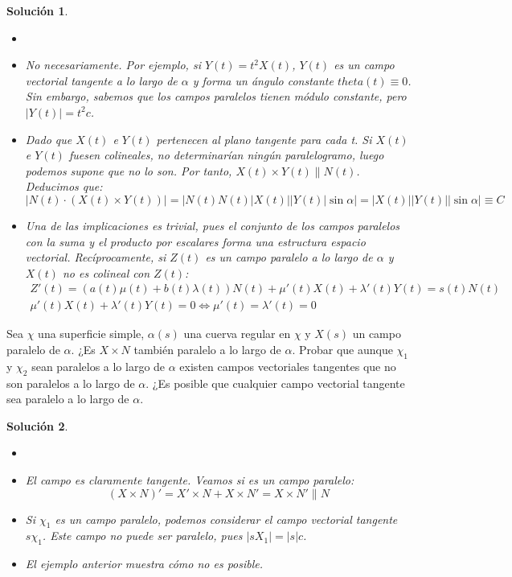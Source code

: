 \documentclass{article}
\theoremstyle{plain}
\newtheorem*{sol*}{Solución}
\newcommand{\X}{\chi}
\newenvironment{ejercicio}[2][Estado]{\begin{trivlist}
\item[\hskip \labelsep {\bfseries Ejercicio}\hskip \labelsep {\bfseries #2.}]}{\end{trivlist}}
\begin{document}
\begin{sol*}
\begin{itemize}
\item[]
\item No necesariamente. Por ejemplo, si $Y(t)=t^2 X(t)$, $Y(t)$ es un campo vectorial tangente a lo largo de $\alpha$ y forma un ángulo constante $theta(t)\equiv 0$. Sin embargo, sabemos que los campos paralelos tienen módulo constante, pero $|Y(t)| = t^2 c$.
\item Dado que $X(t)$ e $Y(t)$ pertenecen al plano tangente para cada t. Si $X(t)$ e $Y(t)$ fuesen colineales, no determinarían ningún paralelogramo, luego podemos supone que no lo son. Por tanto, $X(t)\times Y(t) \parallel N(t)$. Deducimos que:
\[
|N(t)\cdot (X(t)\times Y(t))| = |N(t)N(t)|X(t)||Y(t)|\sin \alpha| = |X(t)||Y(t)||\sin{\alpha}|\equiv C
\]
\item Una de las implicaciones es trivial, pues el conjunto de los campos paralelos con la suma y el producto por escalares forma una estructura espacio vectorial. Recíprocamente, si $Z(t)$ es un campo paralelo a lo largo de $\alpha$ y $X(t)$ no es colineal con $Z(t)$:
\begin{gather*}
Z'(t) = (a(t)\mu(t)+b(t)\lambda(t))N(t) + \mu'(t)X(t)+\lambda'(t)Y(t) = s(t)N(t)\\
 \mu'(t)X(t)+\lambda'(t)Y(t) = 0 \Leftrightarrow \mu'(t)=\lambda'(t)=0
\end{gather*}
\end{itemize}
\end{sol*}
\newpage
\begin{ejercicio}{9}
Sea $\X$ una superficie simple, $\alpha(s)$ una cuerva regular en $\X$ y $X(s)$ un campo paralelo de $\alpha$. ¿Es $X\times N$ también paralelo a lo largo de $\alpha$. Probar que aunque $\X_1$ y $\X_2$ sean paralelos a lo largo de $\alpha$ existen campos vectoriales tangentes que no son paralelos a lo largo de $\alpha$. ¿Es posible que cualquier campo vectorial tangente sea paralelo a lo largo de $\alpha$.
\end{ejercicio}
\begin{sol*}
\begin{itemize}
\item[]
\item El campo es claramente tangente. Veamos si es un campo paralelo:
\[
(X\times N)' = X'\times N + X \times N' = X \times N' \parallel N
\]
\item Si $\X_1$ es un campo paralelo, podemos considerar el campo vectorial tangente $s\X_1$. Este campo no puede ser paralelo, pues $|sX_1|=|s|c$.
\item El ejemplo anterior muestra cómo no es posible.
\end{itemize}
\end{sol*}
\end{document}
